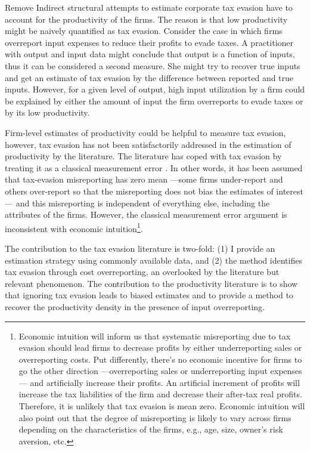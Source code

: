 \documentclass[
  12pt]{article}
\begin{document}
\begin{anfxnote}{Remove}
Indirect structural attempts to estimate corporate tax evasion have to
account for the productivity of the firms. The reason is that low
productivity might be naively quantified as tax evasion. Consider the
case in which firms overreport input expenses to reduce their profits to
evade taxes. A practitioner with output and input data might conclude
that output is a function of inputs, thus it can be considered a second
measure. She might try to recover true inputs and get an estimate of tax
evasion by the difference between reported and true inputs. However, for
a given level of output, high input utilization by a firm could be
explained by either the amount of input the firm overreports to evade
taxes or by its low productivity.

Firm-level estimates of productivity could be helpful to measure tax
evasion, however, tax evasion has not been satisfactorily addressed in
the estimation of productivity by the literature. The literature has
coped with tax evasion by treating it as a classical measurement error
\citep[e.g.,][p.204]{Blalock2004}. In other words, it has been assumed
that tax-evasion misreporting has zero mean ---some firms under-report
and others over-report so that the misreporting does not bias the
estimates of interest--- and this misreporting is independent of
everything else, including the attributes of the firms. However, the
classical measurement error argument is inconsistent with economic
intuition\footnote{Economic intuition will inform us that systematic
  misreporting due to tax evasion should lead firms to decrease profits
  by either underreporting sales or overreporting costs. Put
  differently, there's no economic incentive for firms to go the other
  direction ---overreporting sales or underreporting input expenses---
  and artificially increase their profits. An artificial increment of
  profits will increase the tax liabilities of the firm and decrease
  their after-tax real profits. Therefore, it is unlikely that tax
  evasion is mean zero. Economic intuition will also point out that the
  degree of misreporting is likely to vary across firms depending on the
  characteristics of the firms, e.g., age, size, owner's risk aversion,
  etc.}.

The contribution to the tax evasion literature is two-fold: (1) I
provide an estimation strategy using commonly available data, and (2)
the method identifies tax evasion through cost overreporting, an
overlooked by the literature but relevant phenomenon. The contribution
to the productivity literature is to show that ignoring tax evasion
leads to biased estimates and to provide a method to recover the
productivity density in the presence of input overreporting.


\end{anfxnote}
\end{document}
